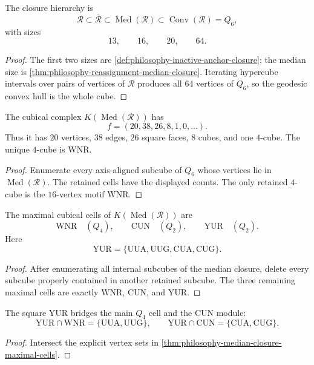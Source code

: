 \begin{theorem}
\label{thm:philosophy-reassignment-closure-chain}
The closure hierarchy is
$$
  \mathcal{R}
  \subset
  \overline{\mathcal{R}}
  \subset
  \operatorname{Med}(\mathcal{R})
  \subset
  \operatorname{Conv}(\mathcal{R})
  =
  Q_{6},
$$
with sizes
$$
  13,\qquad 16,\qquad 20,\qquad 64.
$$
\end{theorem}
\begin{proof}
The first two sizes are
\autoref{def:philosophy-inactive-anchor-closure}; the median size is
\autoref{thm:philosophy-reassignment-median-closure}. Iterating
hypercube intervals over pairs of vertices of $\mathcal{R}$ produces
all $64$ vertices of $Q_{6}$, so the geodesic convex hull is the whole
cube.
\end{proof}

\begin{theorem}
\label{thm:philosophy-median-closure-f-vector}
The cubical complex $K(\operatorname{Med}(\mathcal{R}))$ has
$$
  f=(20,38,26,8,1,0,\ldots).
$$
Thus it has $20$ vertices, $38$ edges, $26$ square faces, $8$ cubes,
and one $4$-cube. The unique $4$-cube is $\mathrm{WNR}$.
\end{theorem}
\begin{proof}
Enumerate every axis-aligned subcube of $Q_{6}$ whose vertices lie in
$\operatorname{Med}(\mathcal{R})$. The retained cells have the displayed
counts. The only retained $4$-cube is the $16$-vertex motif
$\mathrm{WNR}$.
\end{proof}

\begin{theorem}
\label{thm:philosophy-median-closure-maximal-cells}
The maximal cubical cells of $K(\operatorname{Med}(\mathcal{R}))$ are
$$
  \mathrm{WNR}\quad(Q_{4}),\qquad
  \mathrm{CUN}\quad(Q_{2}),\qquad
  \mathrm{YUR}\quad(Q_{2}).
$$
Here
$$
  \mathrm{YUR}
  =
  \{\mathrm{UUA},\mathrm{UUG},\mathrm{CUA},\mathrm{CUG}\}.
$$
\end{theorem}
\begin{proof}
After enumerating all internal subcubes of the median closure, delete
every subcube properly contained in another retained subcube. The three
remaining maximal cells are exactly $\mathrm{WNR}$, $\mathrm{CUN}$, and
$\mathrm{YUR}$.
\end{proof}

\begin{corollary}
\label{cor:philosophy-median-bridge-face}
The square $\mathrm{YUR}$ bridges the main $Q_{4}$ cell and the CUN
module:
$$
  \mathrm{YUR}\cap\mathrm{WNR}
  =
  \{\mathrm{UUA},\mathrm{UUG}\},
  \qquad
  \mathrm{YUR}\cap\mathrm{CUN}
  =
  \{\mathrm{CUA},\mathrm{CUG}\}.
$$
\end{corollary}
\begin{proof}
Intersect the explicit vertex sets in
\autoref{thm:philosophy-median-closure-maximal-cells}.
\end{proof}

